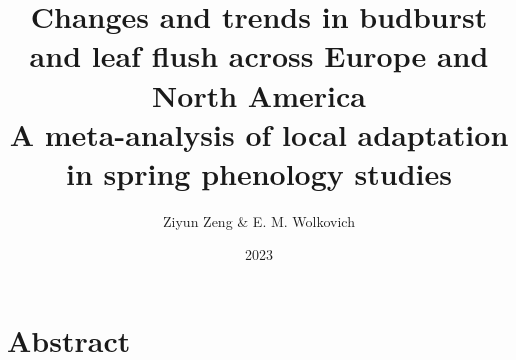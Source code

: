 \documentclass{article}
\begin{document}
\title{{\huge Changes and trends in budburst and leaf flush across Europe and North America} \\A meta-analysis of local adaptation in spring phenology studies}
\author{Ziyun Zeng \& E. M. Wolkovich}
\date{2023}
\maketitle 


\newpage

\section*{Abstract}


\end{document}

